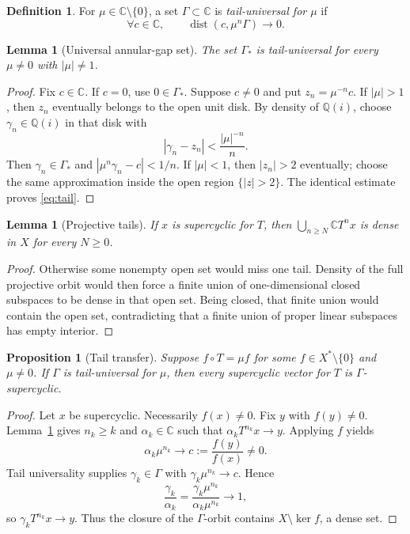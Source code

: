 \documentclass[11pt]{article}
\newtheorem{proposition}[theorem]{Proposition}
\newtheorem{lemma}[theorem]{Lemma}
\theoremstyle{definition}
\newtheorem{definition}[theorem]{Definition}
\newcommand{\C}{\mathbb C}
\newcommand{\Q}{\mathbb Q}
\newcommand{\dist}{\operatorname{dist}}
\newcommand{\Gamstar}{\Gamma_{\!*}}
\begin{document}
\begin{definition}
For $\mu\in\C\setminus\{0\}$, a set $\Gamma\subset\C$ is
\emph{tail-universal for $\mu$} if
\begin{equation}\label{eq:tail}
 \forall c\in\C,\qquad \dist(c,\mu^n\Gamma)\longrightarrow0.
\end{equation}
\end{definition}

\begin{lemma}[Universal annular-gap set]\label{lem:common-tail}
The set $\Gamstar$ is tail-universal for every $\mu\ne0$ with
$|\mu|\ne1$.
\end{lemma}

\begin{proof}
Fix $c\in\C$.  If $c=0$, use $0\in\Gamstar$.  Suppose $c\ne0$ and put
$z_n=\mu^{-n}c$.  If $|\mu|>1$, then $z_n$ eventually belongs to the open
unit disk.  By density of $\Q(i)$, choose $\gamma_n\in\Q(i)$ in that disk
with
\[
 |\gamma_n-z_n|<\frac{|\mu|^{-n}}{n}.
\]
Then $\gamma_n\in\Gamstar$ and
$|\mu^n\gamma_n-c|<1/n$.  If $|\mu|<1$, then $|z_n|>2$ eventually; choose
the same approximation inside the open region $\{|z|>2\}$.  The identical
estimate proves \eqref{eq:tail}.
\end{proof}

\begin{lemma}[Projective tails]\label{lem:tails}
If $x$ is supercyclic for $T$, then
$\bigcup_{n\geq N}\C T^n x$ is dense in $X$ for every $N\geq0$.
\end{lemma}

\begin{proof}
Otherwise some nonempty open set would miss one tail.  Density of the full
projective orbit would then force a finite union of one-dimensional closed
subspaces to be dense in that open set.  Being closed, that finite union
would contain the open set, contradicting that a finite union of proper
linear subspaces has empty interior.
\end{proof}

\begin{proposition}[Tail transfer]\label{prop:transfer}
Suppose $f\circ T=\mu f$ for some $f\in X^*\setminus\{0\}$ and $\mu\ne0$.
If $\Gamma$ is tail-universal for $\mu$, then every supercyclic vector for
$T$ is $\Gamma$-supercyclic.
\end{proposition}

\begin{proof}
Let $x$ be supercyclic.  Necessarily $f(x)\ne0$.  Fix $y$ with $f(y)\ne0$.
Lemma~\ref{lem:tails} gives $n_k\geq k$ and $\alpha_k\in\C$ such that
$\alpha_kT^{n_k}x\to y$.  Applying $f$ yields
\[
 \alpha_k\mu^{n_k}\longrightarrow c:=\frac{f(y)}{f(x)}\ne0.
\]
Tail universality supplies $\gamma_k\in\Gamma$ with
$\gamma_k\mu^{n_k}\to c$.  Hence
\[
 \frac{\gamma_k}{\alpha_k}
 =\frac{\gamma_k\mu^{n_k}}{\alpha_k\mu^{n_k}}\longrightarrow1,
\]
so $\gamma_kT^{n_k}x\to y$.  Thus the closure of the $\Gamma$-orbit
contains $X\setminus\ker f$, a dense set.
\end{proof}
\end{document}
